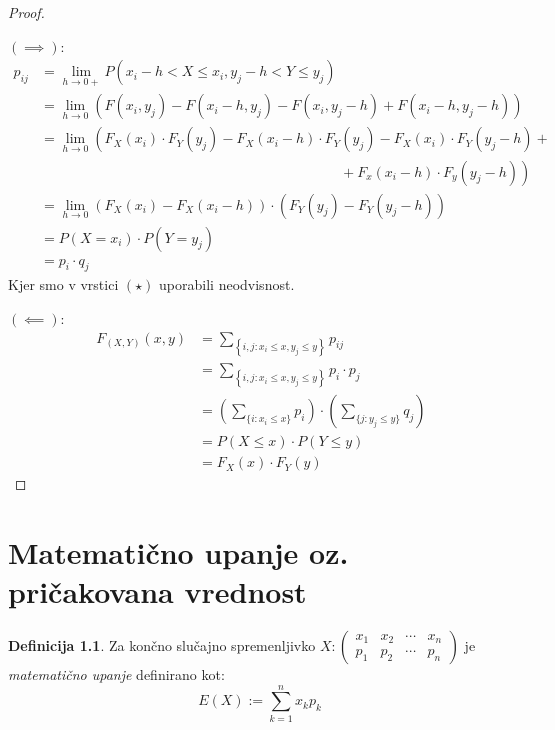 \documentclass[12pt]{book}
\def\n{\noindent}
\def\s{\vspace{10pt}}
\theoremstyle{definition}
\newtheorem{definicija}{Definicija}
\theoremstyle{plain}
\theoremstyle{plain}
\theoremstyle{plain}
\theoremstyle{remark}
\begin{document}
\begin{proof}
    ~

    \n $(\implies)$:
    \begin{align*}
        p_{i j}&=\lim _{h \to 0+} P\left(x_i-h<X \leq x_i, y_j-h< Y \leq y_j\right) \\
        &=\lim _{h \to 0}\left(F\left(x_i, y_j\right)-F\left(x_i-h, y_j\right)-F\left(x_i, y_j-h\right) +F\left(x_i-h, y_j-h\right)\right) \\
        &=\lim _{h \to 0}\left(F_X\left(x_i\right) \cdot F_Y\left(y_j\right)-F_X\left(x_i-h\right) \cdot F_Y\left(y_j\right)-F_X\left(x_i\right) \cdot F_Y\left(y_j-h\right) \right. + \tag{$\star$} \\
        & \hspace{9cm} +\left. F_x\left(x_i-h\right) \cdot F_y\left(y_j-h\right)\right) \\
        &=\lim_{h \to 0}\left(F_X\left(x_i\right)-F_X\left(x_i-h\right)\right) \cdot\left(F_Y\left(y_j\right)-F_Y\left(y_j-h\right)\right) \\
        &=P\left(X=x_i\right) \cdot P\left(Y=y_j\right) \\
        &=p_i \cdot q_j
    \end{align*}
    Kjer smo v vrstici $(\star)$ uporabili neodvisnost. \s

    \n $(\impliedby)$:
    \begin{align*}
        \quad F_{(X, Y)}(x, y)&=\sum_{\left\{i,j: x_i \leq x,y_j \leq y\right\}} p_{i j} & \\
        &=\sum_{\left\{i,j: x_i \leq x,y_j \leq y\right\}} p_i \cdot p_j & \\
        &=\left(\sum_{\{i: x_i \leq x\}} p_i\right) \cdot \left(\sum_{\{j: y_j \leq y\}} q_j\right) & \\
        &=P(X \leq x) \cdot P(Y \leq y) & \\
        &=F_X(x) \cdot F_Y(y) &
    \end{align*}
\end{proof}

\chapter[Matematično upanje oz. pričakovana vrednost]{Matematično upanje oz.\\pričakovana vrednost}

\begin{definicija}
    Za končno slučajno spremenljivko 
    $X:\left(\begin{array}{llll}
    x_1 & x_2 & \cdots & x_n \\
    p_1 & p_2 & \cdots & p_n
    \end{array}\right)$
    je \emph{matematično upanje} definirano kot: 
    $$
    E(X):=\sum_{k=1}^n x_k p_k
    $$
\end{definicija}
\end{document}
